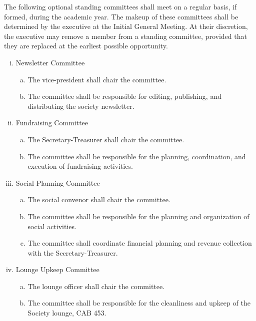 \documentclass[11pt]{article}
\begin{document}
\begin{enumerate}[I.]
\begin{enumerate}[A)]
      The following optional standing committees shall meet on a regular basis,
        if formed, during the academic year. The makeup of these committees
        shall be determined by the executive at the Initial General Meeting. At
        their discretion, the executive may remove a member from a standing
        committee, provided that they are replaced at the earliest possible
        opportunity.
        \begin{enumerate}[i)]
          \item Newsletter Committee
            \begin{enumerate}[a)]
              \item The vice-president shall chair the committee.
              \item The committee shall be responsible for editing, publishing,
                and distributing the society newsletter.
            \end{enumerate}
          \item Fundraising Committee
            \begin{enumerate}[a)]
              \item The Secretary-Treasurer shall chair the committee.
              \item The committee shall be responsible for the planning,
                coordination, and execution of fundraising activities.
            \end{enumerate}
          \item Social Planning Committee
            \begin{enumerate}[a)]
              \item The social convenor shall chair the committee.
              \item The committee shall be responsible for the planning and
                organization of social activities.
              \item The committee shall coordinate financial planning and
                revenue collection with the Secretary-Treasurer.
            \end{enumerate}
          \item Lounge Upkeep Committee
            \begin{enumerate}[a)]
              \item The lounge officer shall chair the committee.
              \item  The committee shall be responsible for the cleanliness and
                upkeep of the Society lounge, CAB 453.

\end{enumerate}
\end{enumerate}
\end{enumerate}
\end{enumerate}
\end{document}
